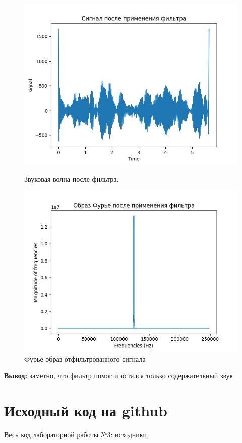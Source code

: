        \newpage
          \begin{figure}[!htb]
              \includegraphics[width=\linewidth]{../images/result/soundwave_filtration1.jpeg}
              \caption{Звуковая волна после фильтра.}
            \endminipage\hfill
              \includegraphics[width=\linewidth]{../images/result/soundwave_filtration1_fourier.jpeg}
              \caption{Фурье-образ отфильтрованного сигнала}
            \endminipage\hfill
            \end{figure}
            \noindent \textbf{Вывод: } заметно, что фильтр помог и остался только содержательный звук
    \section{Исходный код на github}
   \noindent Весь код лабораторной работы №3: \href{https://github.com/D2J3D/Fourier_Labs/tree/main}{исходники}
            